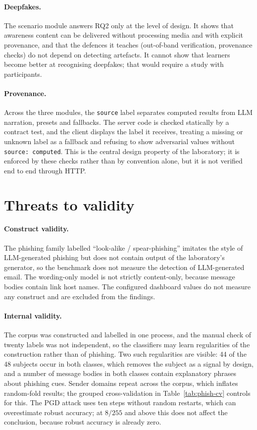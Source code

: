 \paragraph{Deepfakes.} The scenario module answers RQ2 only at the level of design. It shows that awareness content can be delivered without processing media and with explicit provenance, and that the defences it teaches (out-of-band verification, provenance checks) do not depend on detecting artefacts. It cannot show that learners become better at recognising deepfakes; that would require a study with participants.

\paragraph{Provenance.} Across the three modules, the \texttt{source} label separates computed results from LLM narration, presets and fallbacks. The server code is checked statically by a contract test, and the client displays the label it receives, treating a missing or unknown label as a fallback and refusing to show adversarial values without \texttt{source: computed}. This is the central design property of the laboratory; it is enforced by these checks rather than by convention alone, but it is not verified end to end through HTTP.

\section{Threats to validity}
\label{sec:validity}

\paragraph{Construct validity.} The phishing family labelled ``look-alike / spear-phishing'' imitates the style of LLM-generated phishing but does not contain output of the laboratory's generator, so the benchmark does not measure the detection of LLM-generated email. The wording-only model is not strictly content-only, because message bodies contain link host names. The configured dashboard values do not measure any construct and are excluded from the findings.

\paragraph{Internal validity.} The corpus was constructed and labelled in one process, and the manual check of twenty labels was not independent, so the classifiers may learn regularities of the construction rather than of phishing. Two such regularities are visible: 44 of the 48 subjects occur in both classes, which removes the subject as a signal by design, and a number of message bodies in both classes contain explanatory phrases about phishing cues. Sender domains repeat across the corpus, which inflates random-fold results; the grouped cross-validation in Table~\ref{tab:phish-cv} controls for this. The PGD attack uses ten steps without random restarts, which can overestimate robust accuracy; at $8/255$ and above this does not affect the conclusion, because robust accuracy is already zero.

